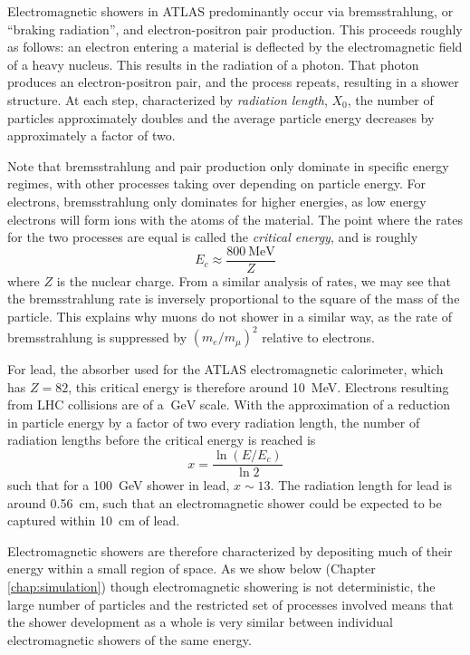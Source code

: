 Electromagnetic showers in ATLAS predominantly occur via bremsstrahlung, or ``braking radiation'', and electron-positron 
pair production. This proceeds roughly as follows: an electron entering a material is deflected by the electromagnetic 
field of a heavy nucleus. This results in the radiation of a photon. That photon produces an electron-positron 
pair, and the process repeats, resulting in a shower structure. At each step, characterized by 
\emph{radiation length}, $X_{0}$, the number of particles approximately doubles and the average particle 
energy decreases by approximately a factor of two. 

Note that bremsstrahlung and pair production only dominate in specific energy regimes, with other processes 
taking over depending on particle energy. For electrons, bremsstrahlung only dominates for higher energies,  
as low energy electrons will form ions with the atoms of the material. The point where the rates for the 
two processes are equal is called the \emph{critical energy}, and is roughly
\begin{equation}
E_{c} \approx \frac{\SI{800}{\MeV}}{Z}
\end{equation}
where $Z$ is the nuclear charge. From a similar analysis of rates, we may see that the bremsstrahlung 
rate is inversely proportional to the square of the mass of the particle. This explains why muons do not 
shower in a similar way, as the rate of bremsstrahlung is suppressed by $(m_{e}/m_{\mu})^2$ relative to electrons.

For lead, the absorber used for the ATLAS electromagnetic calorimeter, which has $Z=82$, this critical energy 
is therefore around \SI{10}{\MeV}. Electrons resulting from LHC collisions are of a $\SI{}{\GeV}$ scale. 
With the approximation of a reduction in particle energy by a factor of two every radiation length, the number of radiation lengths before the critical energy is reached is 
\begin{equation}
x = \frac{\ln{(E/E_{c})}}{\ln{2}}
\end{equation}
such that for a \SI{100}{\GeV} shower in lead, $x\sim 13$. The radiation length for lead is around \SI{0.56}{\cm},
such that an electromagnetic shower could be expected to be captured within \SI{10}{\cm} of lead. 

Electromagnetic showers are therefore characterized by depositing much of their energy within a small region 
of space. As we show below (Chapter \ref{chap:simulation}) though electromagnetic showering is not deterministic, 
the large number of particles and the restricted set of processes involved means that the shower development as a whole 
is very similar between individual electromagnetic showers of the same energy.

